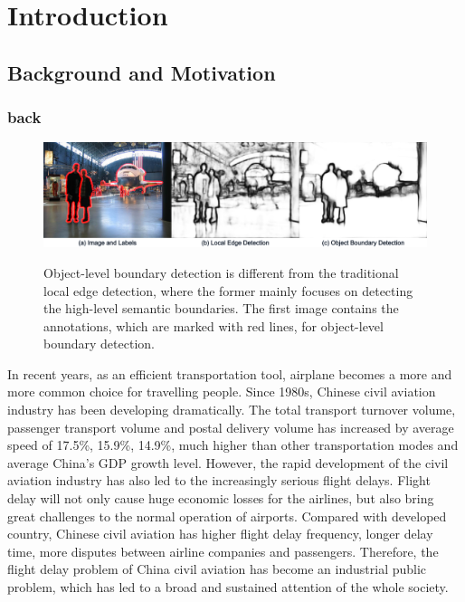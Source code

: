 \documentclass[senior]{IPSstyle}
\begin{document}
 \makepreliminarypages
 \singlespace
 \frontmatter
 \tableofcontents
 \listoffigures
 \listoftables
 \mainmatter
 \clearemptydoublepage
 \setlength{\baselineskip}{23.0pt}

\chapter{Introduction} \label{introduction}



\section{Background and Motivation}
\subsection{back}
\begin{figure}[t]
  \centering
  \includegraphics[width=15cm]{object_boundary_vs_local_edge.png}\\
  \caption{Object-level boundary detection is different from the traditional local edge detection, where the former mainly focuses on detecting the high-level semantic boundaries. The first image contains the annotations, which are marked with red lines, for object-level boundary detection.}\label{object_boundary_vs_local_edge}
\end{figure}

In recent years, as an efficient transportation tool, airplane becomes a more and more common choice for travelling people.
Since 1980s, Chinese civil aviation industry has been developing dramatically. 
The total transport turnover volume, passenger transport volume and postal delivery volume has increased by average speed of 17.5\%, 15.9\%, 14.9\%, much higher than other transportation modes and average China's GDP growth level. 
However, the rapid development of the civil aviation industry has also led to the increasingly serious flight delays.
Flight delay will not only cause huge economic losses for the airlines, but also bring great challenges to the normal operation of airports.
Compared with developed country, Chinese civil aviation has higher flight delay frequency, longer delay time, more disputes between airline companies and passengers.
Therefore, the flight delay problem of China civil aviation has become an industrial public problem, which has led to a broad and sustained attention of the whole society.
\end{document}
